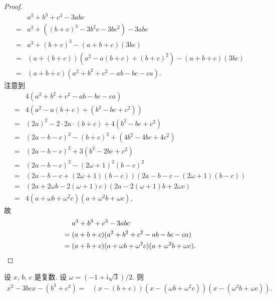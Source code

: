 \begin{proof}
    \begin{align*}
             & a^3 + b^3 + c^3 - 3abc                       \\
        = {} & a^3 + ((b + c)^3 - 3b^2 c - 3bc^2) - 3abc    \\
        = {} & a^3 + (b + c)^3 - (a + b + c)(3bc)           \\
        = {} & (a + (b + c))(a^2 - a(b + c) + (b + c)^2)
        - (a + b + c)(3bc)                                  \\
        = {} & (a + b + c)(a^2 + b^2 + c^2 - ab - bc - ca).
    \end{align*}
    注意到
    \begin{align*}
             & 4(a^2 + b^2 + c^2 - ab - bc - ca)          \\
        = {} & 4(a^2  - a(b + c) + (b^2 - bc + c^2))      \\
        = {} & (2a)^2 - 2 \cdot 2a \cdot (b + c)
        + 4(b^2 - bc + c^2)                               \\
        = {} & (2a - b - c)^2 - (b + c)^2
        + (4b^2 - 4bc + 4c^2)                             \\
        = {} & (2a - b - c)^2 + 3(b^2 - 2bc + c^2)        \\
        = {} & (2a - b - c)^2 - (2\omega + 1)^2 (b - c)^2 \\
        = {} & (2a - b - c + (2\omega + 1)(b - c))
        (2a - b - c - (2\omega + 1)(b - c))               \\
        = {} & (2a + 2\omega b - 2(\omega + 1) c)
        (2a - 2(\omega + 1) b + 2\omega c)                \\
        = {} & 4(a + \omega b + \omega^2 c)
        (a + \omega^2 b + \omega c),
    \end{align*}
    故
    \begin{align*}
             & a^3 + b^3 + c^3 - 3abc                      \\
        = {} & (a + b + c)(a^2 + b^2 + c^2 - ab - bc - ca) \\
        = {} & (a + b + c)(a + \omega b + \omega^2 c)
        (a + \omega^2 b + \omega c).
        \qedhere
    \end{align*}
\end{proof}

\begin{theorem}
    设 \(x\), \(b\), \(c\) 是复数.
    设 \(\omega = (-1 + \mathrm{i} \sqrt{3})/2\).
    则
    \begin{align*}
        x^3 - 3bcx - (b^3 + c^3)
        = {} & (x - (b + c))(x - (\omega b + \omega^2 c))
        (x - (\omega^2 b + \omega c)).
    \end{align*}
\end{theorem}

